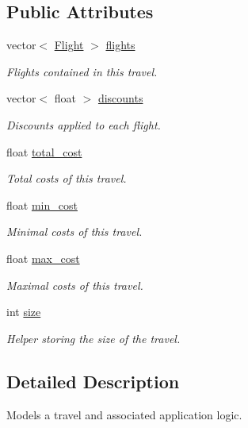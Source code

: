 \subsection*{Public Attributes}
\begin{DoxyCompactItemize}
\item 
vector$<$ \hyperlink{struct_flight}{Flight} $>$ \hyperlink{class_travel_ad6f9e84e91a48ffcf60b7de21f01b0b5}{flights}
\begin{DoxyCompactList}\small\item\em Flights contained in this travel. \end{DoxyCompactList}\item 
vector$<$ float $>$ \hyperlink{class_travel_a153257830f638fa10e69f6c83a92e1fe}{discounts}
\begin{DoxyCompactList}\small\item\em Discounts applied to each flight. \end{DoxyCompactList}\item 
float \hyperlink{class_travel_a8493b95322d534e6ddff9e003b591ec5}{total\-\_\-cost}
\begin{DoxyCompactList}\small\item\em Total costs of this travel. \end{DoxyCompactList}\item 
float \hyperlink{class_travel_a29e09bf718386754dc5cf85bee4305f5}{min\-\_\-cost}
\begin{DoxyCompactList}\small\item\em Minimal costs of this travel. \end{DoxyCompactList}\item 
float \hyperlink{class_travel_a9bd372e0cfad472282e23aa6273a5faa}{max\-\_\-cost}
\begin{DoxyCompactList}\small\item\em Maximal costs of this travel. \end{DoxyCompactList}\item 
int \hyperlink{class_travel_a6ba08aa2208a879b9bc1612133e0b2bf}{size}
\begin{DoxyCompactList}\small\item\em Helper storing the size of the travel. \end{DoxyCompactList}\end{DoxyCompactItemize}


\subsection{Detailed Description}
Models a travel and associated application logic. 

